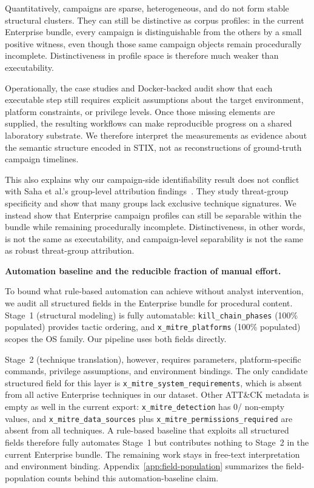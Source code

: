 \documentclass[sigconf]{acmart}
\newcommand{\stix}{STIX\xspace}
\newcommand{\myparagraph}[1]{\textbf{#1.}\hspace{0.5em}}
\begin{document}
Quantitatively, campaigns are sparse, heterogeneous, and do not form stable structural clusters. They can still be distinctive as corpus profiles: in the current Enterprise bundle, every campaign is distinguishable from the others by a small positive witness, even though those same campaign objects remain procedurally incomplete. Distinctiveness in profile space is therefore much weaker than executability.

Operationally, the case studies and Docker-backed audit show that each executable step still requires explicit assumptions about the target environment, platform constraints, or privilege levels. Once those missing elements are supplied, the resulting workflows can make reproducible progress on a shared laboratory substrate. We therefore interpret the measurements as evidence about the semantic structure encoded in \stix{}, not as reconstructions of ground-truth campaign timelines.

This also explains why our campaign-side identifiability result does not conflict with Saha et al.'s group-level attribution findings~\cite{saha2026kitten}. They study threat-group specificity and show that many groups lack exclusive technique signatures. We instead show that Enterprise campaign profiles can still be separable within the bundle while remaining procedurally incomplete. Distinctiveness, in other words, is not the same as executability, and campaign-level separability is not the same as robust threat-group attribution.

\myparagraph{Automation baseline and the reducible fraction of manual effort}

To bound what rule-based automation can achieve without analyst intervention, we audit all structured fields in the Enterprise bundle for procedural content. Stage~1 (structural modeling) is fully automatable: \texttt{kill\_chain\_phases} (100\% populated) provides tactic ordering, and \texttt{x\_mitre\_platforms} (100\% populated) scopes the OS family. Our pipeline uses both fields directly.

Stage~2 (technique translation), however, requires parameters, platform-specific commands, privilege assumptions, and environment bindings. The only candidate structured field for this layer is \texttt{x\_mitre\_system\_requirements}, which is absent from all \nTechniquesAnalysis{} active Enterprise techniques in our dataset. Other ATT\&CK metadata is empty as well in the current export: \texttt{x\_mitre\_detection} has 0/\nTechniquesAnalysis{} non-empty values, and \texttt{x\_mitre\_data\_sources} plus \texttt{x\_mitre\_permissions\_required} are absent from all \nTechniquesAnalysis{} techniques. A rule-based baseline that exploits all structured fields therefore fully automates Stage~1 but contributes nothing to Stage~2 in the current Enterprise bundle. The remaining work stays in free-text interpretation and environment binding.
Appendix~\ref{app:field-population} summarizes the field-population counts behind this automation-baseline claim.
\end{document}
